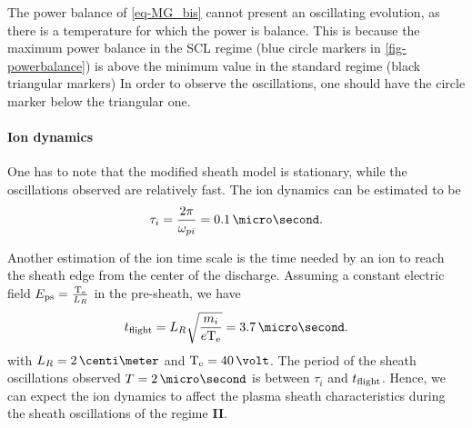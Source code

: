     The power balance of \cref{eq-MG_bis} cannot present an oscillating evolution, as there is a temperature for which the power is balance.
    This is because the maximum power balance in the \ac{SCL} regime (blue circle markers in  \cref{fig-powerbalance}) is above the minimum value in the standard regime (black triangular markers)
    In order to observe the oscillations, one should have the circle marker below the triangular one.
    
    
    
    \paragraph{ Ion dynamics \\}

    One has to note that the modified sheath model is stationary, while the oscillations observed are relatively fast.
    The ion dynamics can be estimated to be
    \begin{equation} \label{eq-ti}
      \tau_i = \frac{2 \pi}{\opi} = 0.1 \,\micro\second.
    \end{equation}
    
    Another estimation of the ion time scale is the time needed by an ion to reach the sheath edge from the center of the discharge.
    Assuming a constant electric field $E_{\rm ps} = \frac{\mathrm{T_e}}{L_R}$ in the pre-sheath, we have
    \begin{equation} \label{eq-tof}
      t_{\rm flight} = L_R \sqrt{\frac{m_i}{e \Te}} = 3.7 \,\micro\second.
    \end{equation}
    with $L_R=2\,\centi\meter$ and $\Te=40\,\volt$.
    The period of the sheath oscillations observed $T = 2\,\micro\second$ is between $\tau_i$ and $t_{\rm flight}$.
    Hence, we can expect the ion dynamics to affect the plasma sheath characteristics during the sheath oscillations of the regime {\bf II}.
    
